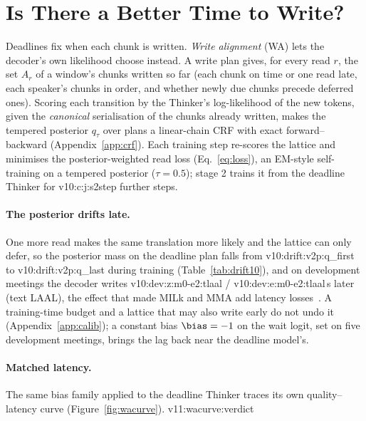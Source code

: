 \section{Is There a Better Time to Write?}
\label{sec:write}
\label{sec:method-latent}

Deadlines fix when each chunk is written. \emph{Write alignment} (WA) lets the decoder's own likelihood choose instead.
A write plan gives, for every read $r$, the set $A_r$ of a window's chunks written so far (each chunk on time or one
read late, each speaker's chunks in order, and whether newly due chunks precede deferred ones). Scoring each transition
by the Thinker's log-likelihood of the new tokens, given the \emph{canonical} serialisation of the chunks already
written, makes the tempered posterior $q_\tau$ over plans a linear-chain CRF with exact forward--backward
(Appendix~\ref{app:crf}). Each training step re-scores the lattice and minimises the posterior-weighted read loss
(Eq.~\eqref{eq:loss}), an EM-style self-training on a tempered posterior ($\tau=0.5$); stage 2 trains it from the
deadline Thinker for \num{v10:c:j:s2step} further steps.

\paragraph{The posterior drifts late.} One more read makes the same translation more likely and the lattice can only
defer, so the posterior mass on the deadline plan falls from \num{v10:drift:v2p:q_first} to
\num{v10:drift:v2p:q_last} during training (Table~\ref{tab:drift10}), and on development meetings the decoder writes
\num{v10:dev:z:m0-e2:tlaal} / \num{v10:dev:e:m0-e2:tlaal}\,s later (text LAAL), the effect that made MILk and MMA add
latency losses~\citep{arivazhagan2019milk,ma2020mma}. A training-time budget and a lattice that may also write early
do not undo it (Appendix~\ref{app:calib}); a constant bias $\bias=-1$ on the wait logit, set on five development
meetings, brings the lag back near the deadline model's.
\ifWAcurve

\paragraph{Matched latency.} The same bias family applied to the deadline Thinker traces its own quality--latency
curve (Figure~\ref{fig:wacurve}). \num{v11:wacurve:verdict}
\fi

